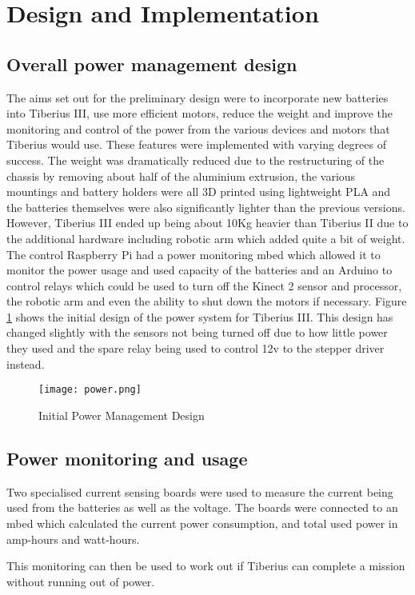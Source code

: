 \section{Design and Implementation}

\subsection{Overall power management design}

The aims set out for the preliminary design were to incorporate new batteries into Tiberius III, use more efficient motors, reduce the weight and improve the monitoring and control of the power from the various devices and motors that Tiberius would use.  These features were implemented with varying degrees of success.  
The weight was dramatically reduced due to the restructuring of the chassis by removing about half of the aluminium extrusion, the various mountings and battery holders were all 3D printed using lightweight PLA and the batteries themselves were also significantly lighter than the previous versions.  However, Tiberius III ended up being about 10Kg heavier than Tiberius II due to the additional hardware including robotic arm which added quite a bit of weight.  
\newline
The control Raspberry Pi had a power monitoring mbed which allowed it to monitor the power usage and used capacity of the batteries and an Arduino to control relays which could be used to turn off the Kinect 2 sensor and processor, the robotic arm and even the ability to shut down the motors if necessary. Figure \ref{fig:power} shows the initial design of the power system for Tiberius III. This design has changed slightly with the sensors not being turned off due to how little power they used and the spare relay being used to control 12v to the stepper driver instead.

  

\begin{figure}[!htb]
\begin{center}
\texttt{[image: power.png]}
\end{center}
\caption{Initial Power Management Design}
\label{fig:power}
\end{figure}

\subsection{Power monitoring and usage}
Two specialised current sensing boards were used to measure the current being used from the batteries as well as the voltage. The boards were connected to an mbed which calculated the current power consumption, and total used power in amp-hours and watt-hours.

This monitoring can then be used to work out if Tiberius can complete a mission without running out of power.
